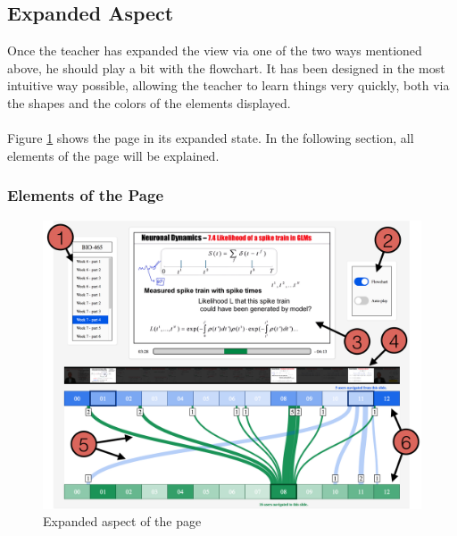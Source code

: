 \documentclass[11pt,a4paper]{article}
\begin{document}
\subsection{Expanded Aspect}

Once the teacher has expanded the view via one of the two ways mentioned above, he should play a bit with the flowchart. It has been designed in the most intuitive way possible, allowing the teacher to learn things very quickly, both via the shapes and the colors of the elements displayed. \\
\\
Figure \ref{expanded} shows the page in its expanded state. In the following section, all elements of the page will be explained.

\subsubsection{Elements of the Page}

\begin{figure}[t]
\captionsetup{justification=centering}
\includegraphics[width=\textwidth]{pictures/expanded_annotated.png}
\caption{Expanded aspect of the page}
\label{expanded}
\end{figure} 
\end{document}
